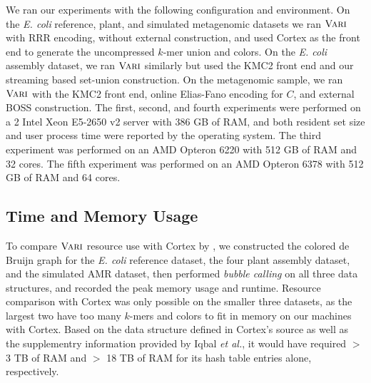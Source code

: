We ran our experiments with the following configuration and environment.  On the {\it E. coli} reference, plant, and simulated metagenomic datasets we ran $\mbox{\rm {\sc Vari}}$ with RRR encoding, without external construction, and used {\sc Cortex} as the front end to generate the uncompressed $k$-mer union and colors.  On the {\it E. coli} assembly dataset, we ran $\mbox{\rm {\sc Vari}}$ similarly but used the KMC2 front end and our streaming based set-union construction.  On the metagenomic sample, we ran $\mbox{\rm {\sc Vari}}$ with the KMC2 front end, online Elias-Fano encoding for $C$, and external BOSS construction.
The first, second, and fourth experiments were performed on a 2 Intel Xeon  E5-2650 v2 server with 386 GB of RAM, and both resident set size and user process time were reported by the operating system.  The third experiment was performed on an AMD Opteron  6220  with 512 GB of RAM and 32 cores.  The fifth experiment was performed on an AMD Opteron 6378  with 512 GB of RAM and 64 cores. 

\subsection{Time and Memory Usage}

To compare $\mbox{\rm {\sc Vari}}$ resource use with {\sc Cortex} by \cite{ICTFM12}, we constructed the colored de Bruijn graph for the {\it E. coli} reference dataset, the four plant assembly dataset, and the simulated AMR dataset, then performed {\em bubble calling} on all three data structures,  and recorded the peak memory usage and runtime.    Resource comparison with {\sc Cortex} was only possible on the smaller three datasets, as the largest two have too many $k$-mers and colors to fit in memory on our machines with {\sc Cortex}.  Based on the data structure defined in {\sc Cortex}'s source as well as the supplementry information provided by Iqbal {\it et al.}, it would have required $>$ 3 TB of RAM and $>$ 18 TB of RAM for its hash table entries alone, respectively.







